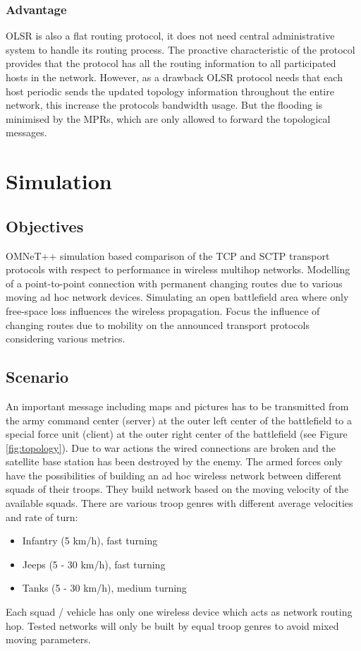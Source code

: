 \documentclass[a4paper]{article}
\begin{document}
\subsubsection{Advantage}
OLSR is also a flat routing protocol, it does not need central administrative system to handle its routing process. The proactive characteristic of the protocol provides that the protocol has all the routing information to all participated hosts in the network. However, as a drawback OLSR
protocol needs that each host periodic sends the updated topology information throughout the entire network, this increase the protocols bandwidth usage. But the flooding is minimised by the MPRs, which are only allowed to forward the topological messages.

\pagebreak
\section{Simulation}

\subsection{Objectives}
OMNeT++ simulation based comparison of the TCP and SCTP transport protocols with respect to performance in wireless multihop networks. Modelling of a point-to-point connection with permanent changing routes due to various moving ad hoc network devices. Simulating an open battlefield area where only free-space loss influences the wireless propagation. Focus the influence of changing routes due to mobility on the announced transport protocols considering various metrics.

\subsection{Scenario}
An important message including maps and pictures has to be transmitted from the army command center (server) at the outer left center of the battlefield to a special force unit (client) at the outer right center of the battlefield (see Figure \ref{fig:topology}). Due to war actions the wired connections are broken and the satellite base station has been destroyed by the enemy. The armed forces only have the possibilities of building an ad hoc wireless network between different squads of their troops. They build network based on the moving velocity of the available squads. There are various troop genres with different average velocities and rate of turn:
\begin{itemize}
	\item Infantry (5 km/h), fast turning
	\item Jeeps (5 - 30 km/h), fast turning
	\item Tanks (5 - 30 km/h), medium turning
\end{itemize}		
Each squad / vehicle has only one wireless device which acts as network routing hop. Tested networks will only be built by equal troop genres to avoid mixed moving parameters.
\end{document}
